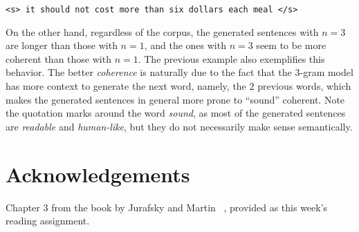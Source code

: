 \documentclass{article}
\begin{document}
\begin{displayquote}
    \texttt{<s> it should not cost more than six dollars each meal </s>}
\end{displayquote}

On the other hand, regardless of the corpus, the generated sentences with $n = 3$ are longer than those with $n = 1$, and the ones with $n = 3$ seem to be more coherent than those with $n = 1$. The previous example also exemplifies this behavior. The better \textit{coherence} is naturally due to the fact that the $3$-gram model has more context to generate the next word, namely, the $2$ previous words, which makes the generated sentences in general more prone to ``sound'' coherent. Note the quotation marks around the word \textit{sound}, as most of the generated sentences are \textit{readable} and \textit{human-like}, but they do not necessarily make sense semantically. 

\clearpage

\section*{Acknowledgements}
Chapter 3 from the book by Jurafsky and Martin ~\cite{jm3}, provided as this week's reading assignment.




\end{document}
